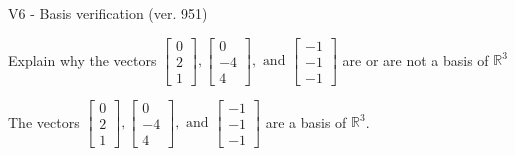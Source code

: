 \begin{exercise}
  \begin{exerciseTitle}V6 - Basis verification (ver. 951)\end{exerciseTitle}
  \begin{exerciseStatement}
    Explain why the vectors \(\left[\begin{array}{r}
0 \\
2 \\
1
\end{array}\right] , \left[\begin{array}{r}
0 \\
-4 \\
4
\end{array}\right] , \text{ and } \left[\begin{array}{r}
-1 \\
-1 \\
-1
\end{array}\right]\) are or are not a basis of \(\mathbb{R}^3\)	


  \end{exerciseStatement}
  \begin{exerciseAnswer}
   The vectors \(\left[\begin{array}{r}
0 \\
2 \\
1
\end{array}\right] , \left[\begin{array}{r}
0 \\
-4 \\
4
\end{array}\right] , \text{ and } \left[\begin{array}{r}
-1 \\
-1 \\
-1
\end{array}\right]\) 
  	 are  a basis of \(\mathbb{R}^3\).
  


  \end{exerciseAnswer}
\end{exercise}